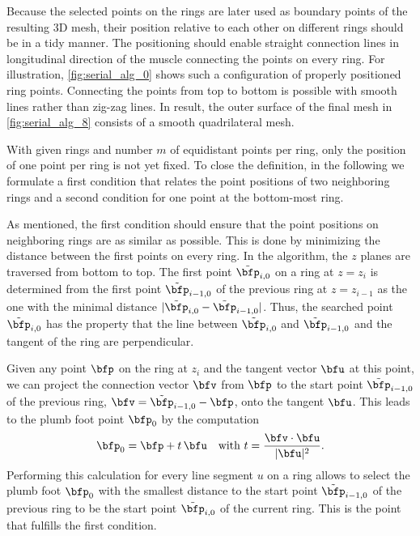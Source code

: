 Because the selected points on the rings are later used as boundary points of the resulting 3D mesh, their position relative to each other on different rings should be in a tidy manner. The positioning should enable straight connection lines in longitudinal direction of the muscle connecting the points on every ring. For illustration, \cref{fig:serial_alg_0} shows such a configuration of properly positioned ring points. Connecting the points from top to bottom is possible with smooth lines rather than zig-zag lines. In result, the outer surface of the final mesh in \cref{fig:serial_alg_8} consists of a smooth quadrilateral mesh.

With given rings and number $m$ of equidistant points per ring, only the position of one point per ring is not yet fixed. To close the definition, in the following we formulate a first condition that relates the point positions of two neighboring rings and a second condition for one point at the bottom-most ring.

As mentioned, the first condition should ensure that the point positions on neighboring rings are as similar as possible. This is done by minimizing the distance between the first points on every ring.
In the algorithm, the $z$ planes are traversed from bottom to top. 
The first point $\tilde{\bfp}_{i,0}$ on a ring at $z=z_i$ is determined from the first point $\tilde{\bfp}_{i-1,0}$ of the previous ring at $z=z_{i-1}$ as the one with the minimal distance $|\tilde{\bfp}_{i,0} - \tilde{\bfp}_{i-1,0}|$. 
Thus, the searched point $\tilde{\bfp}_{i,0}$ has the property that the line between $\tilde{\bfp}_{i,0}$ and $\tilde{\bfp}_{i-1,0}$ and the tangent of the ring are perpendicular.

Given any point $\bfp$ on the ring at $z_i$ and the tangent vector $\bfu$ at this point, we can project the connection vector $\bfv$ from $\bfp$ to the start point $\tilde{\bfp}_{i-1,0}$ of the previous ring, $\bfv = \tilde{\bfp}_{i-1,0} - \bfp$, onto the tangent $\bfu$. This leads to the plumb foot point $\bfp_0$ by the computation
\begin{equation*}
  \begin{array}{lll}
    \bfp_0 = \bfp + t\,\bfu \quad \text{with }t = \dfrac{\bfv \cdot \bfu}{|\bfu|^2}.
  \end{array}
\end{equation*}
Performing this calculation for every line segment $u$ on a ring allows to select the plumb foot $\bfp_0$ with the smallest distance to the start point $\tilde{\bfp}_{i-1,0}$ of the previous ring to be the start point $\tilde{\bfp}_{i,0}$ of the current ring. This is the point that fulfills the first condition.

